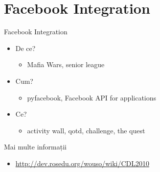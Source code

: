 \documentclass{beamer}
\begin{document}
\section{Facebook Integration}

\begin{frame}{Facebook Integration}
  \begin{itemize}
   \item De ce? 
   \pause
   \begin{itemize}
   \item Mafia Wars, senior league
   \end{itemize}
   \pause 
   \item Cum?
   \pause
   \begin{itemize}
   \item pyfacebook, Facebook API for applications
   \end{itemize}
   \pause
   \item Ce?
   \begin{itemize}
   \item activity wall, qotd, challenge, the quest 
   \end{itemize}
  \end{itemize}
\end{frame}

\begin{frame}{Mai multe informații}
	\begin{itemize}
	\item \url{http://dev.rosedu.org/wouso/wiki/CDL2010}
	\end{itemize}
\end{frame}
\end{document}
